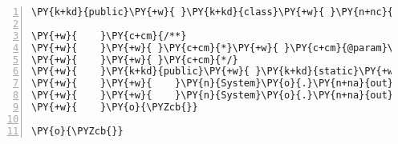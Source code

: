 \begin{Verbatim}[commandchars=\\\{\},numbers=left,firstnumber=1,stepnumber=1,frame=single,fontsize=\small]
\PY{k+kd}{public}\PY{+w}{ }\PY{k+kd}{class}\PY{+w}{ }\PY{n+nc}{ArgumentTest}\PY{+w}{ }\PY{o}{\PYZob{}}

\PY{+w}{    }\PY{c+cm}{/**}
\PY{+w}{    }\PY{+w}{ }\PY{c+cm}{*}\PY{+w}{ }\PY{c+cm}{@param}\PY{+w}{ }\PY{c+cm}{args}
\PY{+w}{    }\PY{+w}{ }\PY{c+cm}{*/}
\PY{+w}{    }\PY{k+kd}{public}\PY{+w}{ }\PY{k+kd}{static}\PY{+w}{ }\PY{k+kt}{void}\PY{+w}{ }\PY{n+nf}{main}\PY{o}{(}\PY{n}{String}\PY{o}{[}\PY{o}{]}\PY{+w}{ }\PY{n}{args}\PY{o}{)}\PY{+w}{ }\PY{o}{\PYZob{}}
\PY{+w}{    }\PY{+w}{    }\PY{n}{System}\PY{o}{.}\PY{n+na}{out}\PY{o}{.}\PY{n+na}{println}\PY{o}{(}\PY{l+s}{"引数1="}\PY{+w}{ }\PY{o}{+}\PY{+w}{ }\PY{n}{args}\PY{o}{[}\PY{l+m+mi}{0}\PY{o}{]}\PY{o}{)}\PY{o}{;}
\PY{+w}{    }\PY{+w}{    }\PY{n}{System}\PY{o}{.}\PY{n+na}{out}\PY{o}{.}\PY{n+na}{println}\PY{o}{(}\PY{l+s}{"引数2="}\PY{+w}{ }\PY{o}{+}\PY{+w}{ }\PY{n}{args}\PY{o}{[}\PY{l+m+mi}{1}\PY{o}{]}\PY{o}{)}\PY{o}{;}
\PY{+w}{    }\PY{o}{\PYZcb{}}

\PY{o}{\PYZcb{}}
\end{Verbatim}
